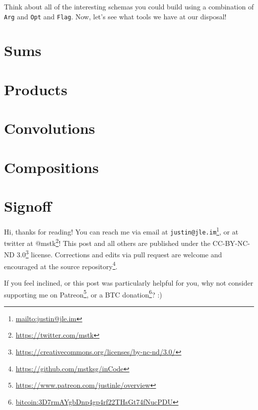 \documentclass[]{article}
\renewcommand{\href}[2]{#2\footnote{\url{#1}}}
\begin{document}
Think about all of the interesting schemas you could build using a combination
of \texttt{Arg} and \texttt{Opt} and \texttt{Flag}. Now, let's see what tools we
have at our disposal!

\hypertarget{sums}{%
\section{Sums}\label{sums}}

\hypertarget{products}{%
\section{Products}\label{products}}

\hypertarget{convolutions}{%
\section{Convolutions}\label{convolutions}}

\hypertarget{compositions}{%
\section{Compositions}\label{compositions}}

\hypertarget{signoff}{%
\section{Signoff}\label{signoff}}

Hi, thanks for reading! You can reach me via email at
\href{mailto:justin@jle.im}{\nolinkurl{justin@jle.im}}, or at twitter at
\href{https://twitter.com/mstk}{@mstk}! This post and all others are published
under the \href{https://creativecommons.org/licenses/by-nc-nd/3.0/}{CC-BY-NC-ND
3.0} license. Corrections and edits via pull request are welcome and encouraged
at \href{https://github.com/mstksg/inCode}{the source repository}.

If you feel inclined, or this post was particularly helpful for you, why not
consider \href{https://www.patreon.com/justinle/overview}{supporting me on
Patreon}, or a \href{bitcoin:3D7rmAYgbDnp4gp4rf22THsGt74fNucPDU}{BTC donation}?
:)
\end{document}
